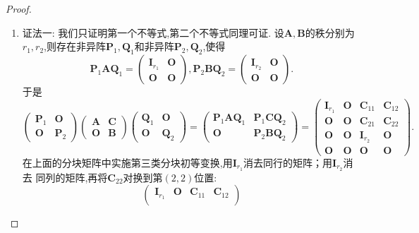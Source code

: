 \documentclass[../../main.tex]{subfiles}
\begin{document}
\begin{proof}
\begin{enumerate}[(1)]
\item  {\color{blue}证法一:} 我们只证明第一个不等式,第二个不等式同理可证. 设\(\boldsymbol{A},\boldsymbol{B}\)的秩分别为\(r_1,r_2\),则存在非异阵\(\boldsymbol{P}_1,\boldsymbol{Q}_1\)和非异阵\(\boldsymbol{P}_2,\boldsymbol{Q}_2\),使得
\[
\boldsymbol{P}_1\boldsymbol{A}\boldsymbol{Q}_1=\begin{pmatrix}
\boldsymbol{I}_{r_1}&\boldsymbol{O}\\
\boldsymbol{O}&\boldsymbol{O}
\end{pmatrix}, \boldsymbol{P}_2\boldsymbol{B}\boldsymbol{Q}_2=\begin{pmatrix}
\boldsymbol{I}_{r_2}&\boldsymbol{O}\\
\boldsymbol{O}&\boldsymbol{O}
\end{pmatrix}.
\]
于是
\[
\begin{pmatrix}
\boldsymbol{P}_1&\boldsymbol{O}\\
\boldsymbol{O}&\boldsymbol{P}_2
\end{pmatrix}
\begin{pmatrix}
\boldsymbol{A}&\boldsymbol{C}\\
\boldsymbol{O}&\boldsymbol{B}
\end{pmatrix}
\begin{pmatrix}
\boldsymbol{Q}_1&\boldsymbol{O}\\
\boldsymbol{O}&\boldsymbol{Q}_2
\end{pmatrix}=
\begin{pmatrix}
\boldsymbol{P}_1\boldsymbol{A}\boldsymbol{Q}_1&\boldsymbol{P}_1\boldsymbol{C}\boldsymbol{Q}_2\\
\boldsymbol{O}&\boldsymbol{P}_2\boldsymbol{B}\boldsymbol{Q}_2
\end{pmatrix}=
\begin{pmatrix}
\boldsymbol{I}_{r_1}&\boldsymbol{O}&\boldsymbol{C}_{11}&\boldsymbol{C}_{12}\\
\boldsymbol{O}&\boldsymbol{O}&\boldsymbol{C}_{21}&\boldsymbol{C}_{22}\\
\boldsymbol{O}&\boldsymbol{O}&\boldsymbol{I}_{r_2}&\boldsymbol{O}\\
\boldsymbol{O}&\boldsymbol{O}&\boldsymbol{O}&\boldsymbol{O}
\end{pmatrix}.
\]
在上面的分块矩阵中实施第三类分块初等变换,用\(\boldsymbol{I}_{r_1}\)消去同行的矩阵；用\(\boldsymbol{I}_{r_2}\)消去
同列的矩阵,再将\(\boldsymbol{C}_{22}\)对换到第\((2,2)\)位置:
\[
\begin{pmatrix}
\boldsymbol{I}_{r_1}&\boldsymbol{O}&\boldsymbol{C}_{11}&\boldsymbol{C}_{12}\\

\end{pmatrix}\]
\end{enumerate}
\end{proof}
\end{document}
